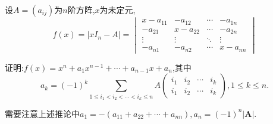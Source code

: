 \documentclass[lang=cn,newtx,10pt,scheme=chinese]{elegantbook}
\begin{document}
\begin{corollary}
设\(A=(a_{ij})\)为\(n\)阶方阵,\(x\)为未定元,
\[
f(x)=\vert xI_n - A\vert = 
\begin{vmatrix}
x - a_{11} & -a_{12} & \cdots & -a_{1n} \\
-a_{21} & x - a_{22} & \cdots & -a_{2n} \\
\vdots & \vdots & \ddots & \vdots \\
-a_{n1} & -a_{n2} & \cdots & x - a_{nn}
\end{vmatrix}
\]

证明:\(f(x)=x^n + a_1x^{n - 1}+ \cdots + a_{n - 1}x + a_n\),其中
\[
a_k=(-1)^k \sum_{1\leq i_1 < i_2<\cdots <i_k\leq n} A
\begin{pmatrix}
i_1 & i_2 & \cdots & i_k \\
i_1 & i_2 & \cdots & i_k
\end{pmatrix}, 1\leq k\leq n.
\]
\end{corollary}
\begin{note}
需要注意上述推论中$a_1=-(a_{11}+a_{22}+\cdots+a_{nn}),a_n=\left( -1 \right) ^n\left| \boldsymbol{A} \right|.$
\end{note}
\end{document}
